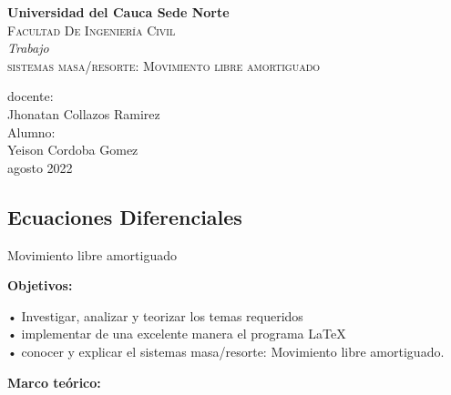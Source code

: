 \documentclass[12pt,a4paper]{article}
\begin{document}
\begin{titlepage}
\centering
{\bfseries\LARGE Universidad del Cauca Sede Norte \\}
\vspace{2cm}
{\scshape\Large Facultad De Ingeniería Civil \\}
\vspace{2cm}
{\itshape\Large Trabajo  \\}
\vspace{2cm}
{\scshape\Huge sistemas masa/resorte: Movimiento libre amortiguado \\}

\vspace{2cm}
\vfill
{\Large docente: \\}
{\Large Jhonatan Collazos Ramirez\\}
\vfill
\vfill
{\Large Alumno: \\}
{\Large Yeison Cordoba Gomez \\}
\vfill
\vspace{1cm}
{\Large agosto 2022 \\}
\end{titlepage}

\begin{center}

 \section*{Ecuaciones Diferenciales}

\begin{large}
{Movimiento libre amortiguado}
\end{large}

\end{center}

\begin{flushleft}
\begin{Large}
\textbf{Objetivos:}
\end{Large}
\end{flushleft}

• Investigar, analizar y teorizar los temas requeridos\\
 
• implementar de una excelente manera el programa LaTeX\\

• conocer y explicar el sistemas masa/resorte: Movimiento libre amortiguado.

\vspace{1cm}

\begin{flushleft}
\begin{Large}
\textbf{Marco teórico:}
\end{Large}
\end{flushleft}
\end{document}
